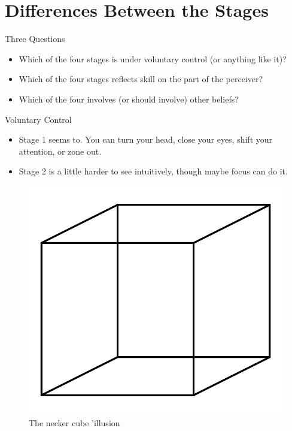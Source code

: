 \documentclass[
  17pt,
  letterpaper,
  ignorenonframetext,
  aspectratio=169,
  handout,
  xcolor={dvipsnames}]{beamer}
\providecommand{\tightlist}{%
  \setlength{\itemsep}{0pt}\setlength{\parskip}{0pt}}\usepackage{longtable,booktabs,array}
\begin{document}
\hypertarget{differences-between-the-stages}{%
\section{Differences Between the
Stages}\label{differences-between-the-stages}}

\begin{frame}{Three Questions}
\protect\hypertarget{three-questions}{}
\begin{itemize}[<+->]
\tightlist
\item
  Which of the four stages is under voluntary control (or anything like
  it)?
\item
  Which of the four stages reflects skill on the part of the perceiver?
\item
  Which of the four involves (or should involve) other beliefs?
\end{itemize}
\end{frame}

\begin{frame}{Voluntary Control}
\protect\hypertarget{voluntary-control}{}
\begin{itemize}[<+->]
\tightlist
\item
  Stage 1 seems to. You can turn your head, close your eyes, shift your
  attention, or zone out.
\item
  Stage 2 is a little harder to see intuitively, though maybe focus can
  do it.
\end{itemize}
\end{frame}

\begin{frame}
\begin{figure}

{\centering \includegraphics[width=\textwidth,height=0.6\textheight]{../images/necker.png}

}

\caption{The necker cube 'illusion}

\end{figure}
\end{frame}
\end{document}
